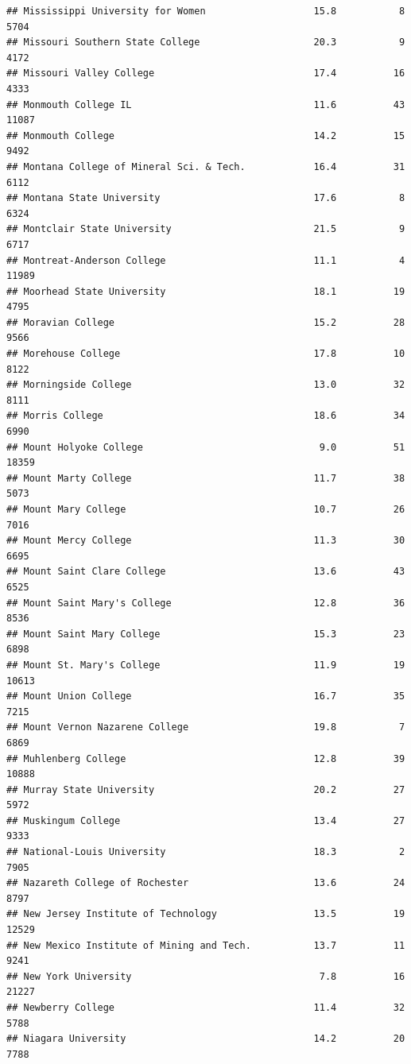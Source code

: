 \documentclass[
]{article}
\begin{document}
\begin{verbatim}
## Mississippi University for Women                   15.8           8   5704
## Missouri Southern State College                    20.3           9   4172
## Missouri Valley College                            17.4          16   4333
## Monmouth College IL                                11.6          43  11087
## Monmouth College                                   14.2          15   9492
## Montana College of Mineral Sci. & Tech.            16.4          31   6112
## Montana State University                           17.6           8   6324
## Montclair State University                         21.5           9   6717
## Montreat-Anderson College                          11.1           4  11989
## Moorhead State University                          18.1          19   4795
## Moravian College                                   15.2          28   9566
## Morehouse College                                  17.8          10   8122
## Morningside College                                13.0          32   8111
## Morris College                                     18.6          34   6990
## Mount Holyoke College                               9.0          51  18359
## Mount Marty College                                11.7          38   5073
## Mount Mary College                                 10.7          26   7016
## Mount Mercy College                                11.3          30   6695
## Mount Saint Clare College                          13.6          43   6525
## Mount Saint Mary's College                         12.8          36   8536
## Mount Saint Mary College                           15.3          23   6898
## Mount St. Mary's College                           11.9          19  10613
## Mount Union College                                16.7          35   7215
## Mount Vernon Nazarene College                      19.8           7   6869
## Muhlenberg College                                 12.8          39  10888
## Murray State University                            20.2          27   5972
## Muskingum College                                  13.4          27   9333
## National-Louis University                          18.3           2   7905
## Nazareth College of Rochester                      13.6          24   8797
## New Jersey Institute of Technology                 13.5          19  12529
## New Mexico Institute of Mining and Tech.           13.7          11   9241
## New York University                                 7.8          16  21227
## Newberry College                                   11.4          32   5788
## Niagara University                                 14.2          20   7788

\end{verbatim}
\end{document}

